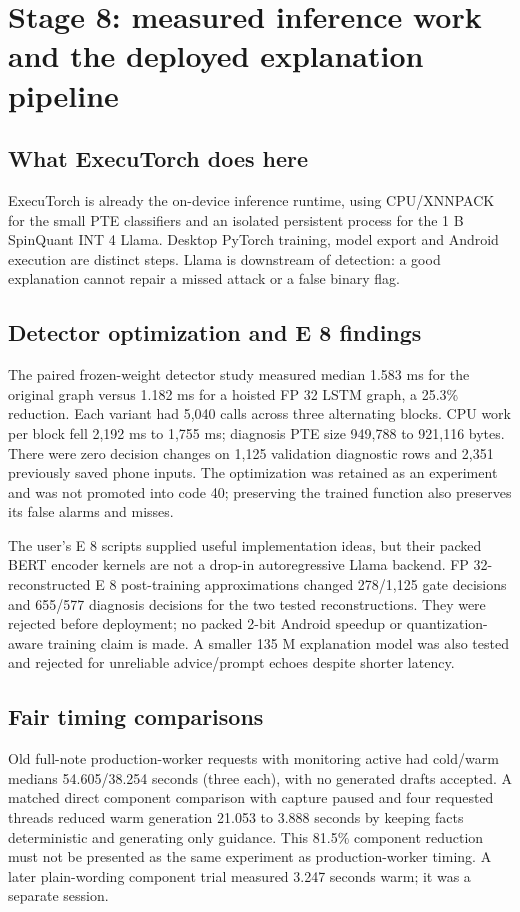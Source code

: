 \documentclass[11pt,a4paper,oneside]{report}
\begin{document}
\chapter{Stage 8: measured inference work and the deployed explanation pipeline}
\section{What ExecuTorch does here}
ExecuTorch is already the on-device inference runtime, using CPU/XNNPACK for the small PTE classifiers and an isolated persistent process for the 1 B SpinQuant INT 4 Llama. Desktop PyTorch training, model export and Android execution are distinct steps. Llama is downstream of detection: a good explanation cannot repair a missed attack or a false binary flag.

\section{Detector optimization and E 8 findings}
The paired frozen-weight detector study measured median 1.583 ms for the original graph versus 1.182 ms for a hoisted FP 32 LSTM graph, a 25.3\% reduction. Each variant had 5,040 calls across three alternating blocks. CPU work per block fell 2,192 ms to 1,755 ms; diagnosis PTE size 949,788 to 921,116 bytes. There were zero decision changes on 1,125 validation diagnostic rows and 2,351 previously saved phone inputs. The optimization was retained as an experiment and was not promoted into code 40; preserving the trained function also preserves its false alarms and misses.

The user's E 8 scripts supplied useful implementation ideas, but their packed BERT encoder kernels are not a drop-in autoregressive Llama backend. FP 32-reconstructed E 8 post-training approximations changed 278/1,125 gate decisions and 655/577 diagnosis decisions for the two tested reconstructions. They were rejected before deployment; no packed 2-bit Android speedup or quantization-aware training claim is made. A smaller 135 M explanation model was also tested and rejected for unreliable advice/prompt echoes despite shorter latency.

\section{Fair timing comparisons}
Old full-note production-worker requests with monitoring active had cold/warm medians 54.605/38.254 seconds (three each), with no generated drafts accepted. A matched direct component comparison with capture paused and four requested threads reduced warm generation 21.053 to 3.888 seconds by keeping facts deterministic and generating only guidance. This 81.5\% component reduction must not be presented as the same experiment as production-worker timing. A later plain-wording component trial measured 3.247 seconds warm; it was a separate session.
\end{document}
